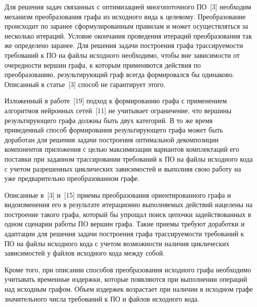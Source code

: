 Для решения задач связанных с оптимизацией многопоточного ПО~[3] необходим механизм преобразования графа из исходного вида к целевому. Преобразование происходит по заранее сформулированным правилам и может осуществляться за несколько итераций. Условие окончания проведения итераций преобразования так же определено заранее. Для решения задачи построения графа трассируемости требований к ПО на файлы исходного необходимо, чтобы вне зависимости от очередности вершин графа, к которым применяются действия по преобразованию, результирующий граф всегда формировался бы одинаково. Описанный в статье~[3] способ не гарантирует этого. 

Изложенный в работе~[19] подход к формированию графа с применением алгоритмов нейронных сетей~[11] не учитывает ограничение, что вершины результирующего графа должны быть двух категорий. В то же время приведенный способ формирования результирующего графа может быть доработан для решения задачи построения оптимальной декомпозиции компонентов приложения с целью максимизации вариантов комплектаций его поставки при заданном трассировании требований к ПО на файлы исходного кода с учетом разрешенных циклических зависимостей и выполняя свою работу на уже предварительно преобразованном графе.

Описанные в~[3] и~[15] приемы преобразования ориентированного графа и видоизменения его в результате итерационно выполняемых действий нацелены на построение такого графа, который бы упрощал поиск цепочки задействованных в одном сценарии работы ПО вершин графа. Такие приемы требуют доработки и адаптации для решения задачи построения графа трассируемости требований к ПО на файлы исходного кода с учетом возможности наличия циклических зависимостей у файлов исходного кода между собой.

Кроме того, при описании способов преобразования исходного графа необходимо учитывать временные издержки, которые появляются при выполнении операций над исходным графом. Объем издержек возрастает при наличии в исходном графе значительного числа требований к ПО и файлов исходного кода.
